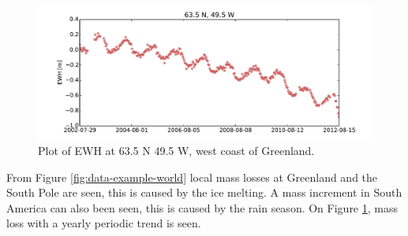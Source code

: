 \begin{figure}[H]
	\centering
	\includegraphics[width=\textwidth]{figures/data-example-scatter}
	\caption{Plot of EWH at 63.5 N 49.5 W, west coast of Greenland.}
	\label{fig:data-example-scatter}
\end{figure}

From Figure \ref{fig:data-example-world} local mass losses at Greenland and the South Pole are seen, this is caused by the ice melting.
A mass increment in South America can also been seen, this is caused by the rain season.
On Figure \ref{fig:data-example-scatter}, mass loss with a yearly periodic trend is seen.

